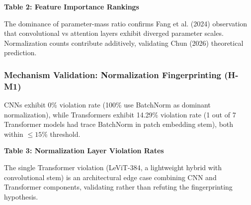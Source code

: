 \textbf{Table 2: Feature Importance Rankings}

\begin{table}[htbp]
\centering
{}
\end{table}

The dominance of parameter-mass ratio confirms Fang et al. (2024) observation that convolutional vs attention layers exhibit diverged parameter scales. Normalization counts contribute additively, validating Chun (2026) theoretical prediction.

\subsubsection{Mechanism Validation: Normalization Fingerprinting (H-M1)}

CNNs exhibit 0\% violation rate (100\% use BatchNorm as dominant normalization), while Transformers exhibit 14.29\% violation rate (1 out of 7 Transformer models had trace BatchNorm in patch embedding stem), both within $\leq 15$\% threshold.

\textbf{Table 3: Normalization Layer Violation Rates}

\begin{table}[htbp]
\centering
{}
\end{table}

The single Transformer violation (LeViT-384, a lightweight hybrid with convolutional stem) is an architectural edge case combining CNN and Transformer components, validating rather than refuting the fingerprinting hypothesis.

